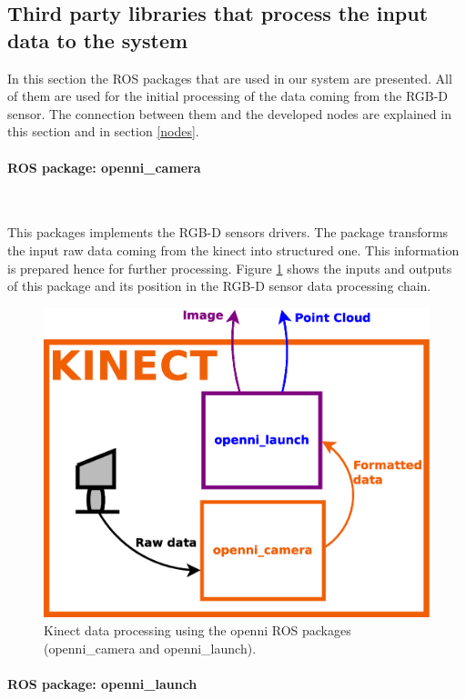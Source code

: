 \subsection{Third party libraries that process the input data to the system}
In this section the ROS packages that are used in our system are presented. 
All of them are used for the initial processing of the data coming from the RGB-D sensor. 
The connection between them and the developed nodes are explained in this section and in section \ref{nodes}.

\paragraph{ROS package: openni\_camera}\mbox{} \\
\label{openni_camera}

This packages implements the RGB-D sensors drivers.
The package transforms the input raw data coming from the kinect into structured one. 
This information is prepared hence for further processing. 
Figure \ref{diagram_kinect_data} shows the inputs and outputs of this package and its position in the RGB-D sensor data processing chain. 
 
 		\begin{figure}[H]
			\begin{center}
			\includegraphics[width=0.5\linewidth]{img/diagrams/kinect_data.eps}
			\caption[Kinect data processing]{Kinect data processing using the openni ROS packages (openni\_camera and openni\_launch).}
			\label{diagram_kinect_data}
			\end{center}
		\end{figure}


\paragraph{ROS package: openni\_launch}\mbox{}\\
\label{openni_launch}

